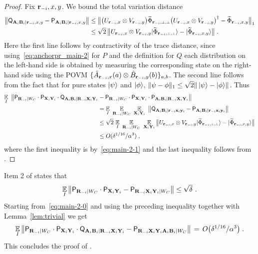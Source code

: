 \begin{proof}
Fix $\mathbf{r}_{-i}, x,y$. We bound the total variation distance
\begin{align}
	\big \| \Qsf_{\bA_i \bB_i | \br_\mi, x,y} - \P_{\bA_i \bB_i | \br_\mi,x,y}\big \|
	&\leq  \big \|  \big (   U_{\br_\mi,x} \otimes V_{\br_\mi,y} \big) \wt{\Phi}_{\sspp} \big (   U_{\br_\mi,x} \otimes V_{\br_\mi,y} \big)^\dagger -  \wt{\Phi}_{\br_\mi,x,y}   \big \|_1 \notag\\
	&\leq \sqrt{2} \,\big\| U_{\br_\mi,x} \otimes V_{\br_\mi,y} \ket{\wt{\Phi}_\sspp} - \ket{\wt{\Phi}_{\ssxy}} \big\|\;.\label{eq:main-2-1}
\end{align}
Here the first line follows by contractivity of the trace distance, since using~\eqref{eq:anchorpr_main-2} for $P$ and the definition for $Q$
each distribution on the left-hand side is obtained by measuring the corresponding state on the right-hand side using the POVM $\{\hat{A}_{\mathbf{r}_{-i}, x}(a) \otimes \hat{B}_{\mathbf{r}_{-i}, y}(b)\}_{a,b}$. The second line follows from the fact that for  pure states ${|\psi\rangle}$ and ${|\phi\rangle}$, $ \| \psi - \phi \|_1 \leq \sqrt{2} \|\, {|\psi\rangle} - {|\phi\rangle} \|$.
Thus
\begin{align*}
\Ex_I \,\, \big\| \P_{\bR_\mi |W_C} \cdot \P_{\bX_i \bY_i} \cdot \Qsf_{\bA_i \bB_i |\bR_\mi \bX_i \bY_i } 
	&-  \P_{\bR_\mi |W_C} \cdot \P_{\bX_i \bY_i} \cdot \P_{\bA_i \bB_i | \bR_\mi \bX_i \bY_i} \big \|  \\
	&= \Ex_I \, \, \Ex_{\bR_\mi |W_C} \,\, \Ex_{\bX_i \bY_i} \,\, \big \| \Qsf_{\bA_i \bB_i |\br_\mi \bx_i \by_i} - \P_{\bA_i \bB_i | \br_\mi \bx_i \by_i} \big \|    \\
	&\leq \sqrt{2} \, \Ex_I \, \, \Ex_{\bR_\mi |W_C} \,\, \Ex_{\bX_i \bY_i} \big\| U_{\br_\mi,x} \otimes V_{\br_\mi,y} \ket{\wt{\Phi}_\sspp} - \ket{\wt{\Phi}_{\ssxy}} \big\|\\
	&\leq O(\delta^{1/16}/\alpha^3)\;,
\end{align*}
where the first inequality is by~\eqref{eq:main-2-1} and the last inequality follows from .
\end{proof}


 Item 2 of  states that 
\[
\operatorname*{\mathbb{E}}_I \left \| \mathsf{P}_{\mathbf{R}_{-i} |W_C} \cdot \mathsf{P}_{\mathbf{X}_i \mathbf{Y}_i} - \mathsf{P}_{\mathbf{R}_{-i} \mathbf{X}_i \mathbf{Y}_i | W_C} \right \| \leq \sqrt{\delta}~.
\] 
Starting from~\eqref{eq:main-2-0} and using the preceding inequality together with Lemma~\ref{lem:trivial} we get
\[
\operatorname*{\mathbb{E}}_I \left \|  \mathsf{P}_{\mathbf{R}_{-i} |W_C} \cdot \mathsf{P}_{\mathbf{X}_i \mathbf{Y}_i} \cdot \mathsf{Q}_{\mathbf{A}_i \mathbf{B}_i |\mathbf{R}_{-i} \mathbf{X}_i \mathbf{Y}_i } 
	-  \mathsf{P}_{\mathbf{R}_{-i} \mathbf{X}_i \mathbf{Y}_i \mathbf{A}_i \mathbf{B}_i |W_C}  \right \| \,=\, O\big(\delta^{1/16}/\alpha^3\big)\;.
\]
This concludes the proof of .

